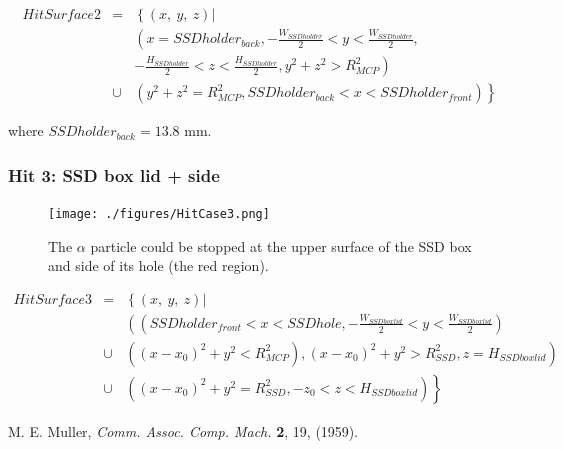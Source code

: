 \documentclass{article}
\begin{document}
\begin{eqnarray*}
	HitSurface2 & = & \left\{(x,~y,~z) \right| \\
	& & \left( x=SSDholder_{back}, -\frac{W_{SSDholder}}{2}  < y < \frac{W_{SSDholder}}{2},\right. \\
	& & \left. -\frac{H_{SSDholder}}{2} < z < \frac{H_{SSDholder}}{2}, y^2+z^2 > R_{MCP}^2 \right) \\
	& \cup & \left. \left( y^2+z^2 = R_{MCP}^2, SSDholder_{back} < x < SSDholder_{front} \right) \right\}
\end{eqnarray*}

where $SSDholder_{back} = 13.8$ mm.

\subsubsection{Hit 3: SSD box lid + side}

\begin{figure}[H]
  \begin{center}
    \texttt{[image: ./figures/HitCase3.png]}
	  \caption{The $\alpha$ particle could be stopped at the upper surface of the SSD box and side of its hole (the red region).}
    \label{fig:HitCase3}
  \end{center}
\end{figure}

\begin{eqnarray*}
	HitSurface3 & = & \left\{(x,~y,~z) \right| \\
	& & \left( \left( SSDholder_{front} < x < SSDhole, -\frac{W_{SSDboxlid}}{2} < y < \frac{W_{SSDboxlid}}{2} \right) \right. \\
	& \cup & \left. \left( (x-x_0)^2+y^2<R_{MCP}^2 \right), (x-x_0)^2+y^2 > R_{SSD}^2, z = H_{SSDboxlid} \right) \\
	& \cup & \left. \left( (x-x_0)^2+y^2 = R_{SSD}^2, -z_0 < z < H_{SSDboxlid} \right) \right\}
\end{eqnarray*}


\begin{thebibliography}{9}
	 M. E. Muller, {\it Comm. Assoc. Comp. Mach.} {\bf 2}, 19, (1959).
\end{thebibliography}
\end{document}
